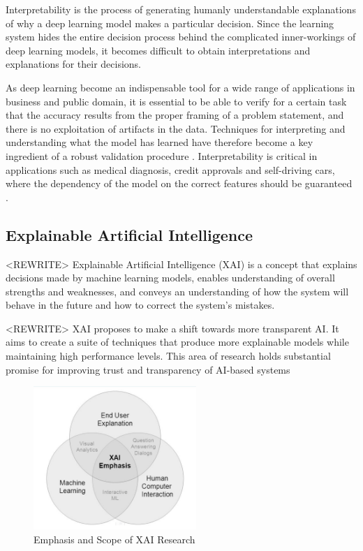 Interpretability is the process of generating humanly understandable explanations of why a deep learning model makes a particular decision. Since the learning system hides the entire decision process behind the complicated inner-workings of deep learning models, it becomes difficult to obtain interpretations and explanations for their decisions.

As deep learning become an indispensable tool for a wide range of applications in business and public domain, it is essential to be able to verify for a certain task that the accuracy results from the proper framing of a problem statement, and there is no exploitation of artifacts in the data. Techniques for interpreting and understanding what the model has learned have therefore become a key ingredient of a robust validation procedure \cite{taylor2006methods} \cite{hansen2011visual} \cite{bach2015pixel}. Interpretability is critical in applications such as medical diagnosis, credit approvals and self-driving cars, where the dependency of the model on the correct features should be guaranteed \cite{Caruana:2015:IMH:2783258.2788613} \cite{bojarski2017explaining}.

\subsection{Explainable Artificial Intelligence}
<REWRITE> Explainable Artificial Intelligence (XAI) is a concept that explains decisions made by machine learning models, enables understanding of overall strengths and weaknesses, and conveys an understanding of how the system will behave in the future and how to correct the system’s mistakes. 

<REWRITE> XAI proposes to make a shift towards more transparent AI. It aims to create a suite of techniques that produce more explainable models while maintaining high performance levels. This area of research holds substantial promise for improving trust and transparency of AI-based systems

\begin{figure}[htbp]
\centering
\includegraphics[width=0.55\textwidth]{images/XAI-research-1-crop.png}
\caption{Emphasis and Scope of XAI Research}
\label{fig:xai-1}
\end{figure}

